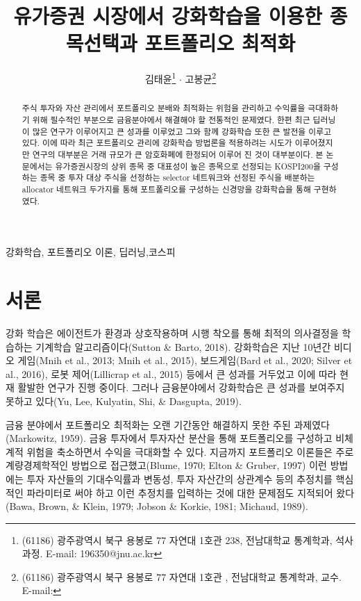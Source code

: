 \documentclass[a4paper]{article}
\begin{document}
\title{유가증권 시장에서 강화학습을 이용한 종목선택과 포트폴리오 최적화}%

\author{
김태윤\footnote{(61186) 광주광역시 북구 용봉로 77 자연대 1호관 238, 전남대학교 통계학과, 석사과정. E-mail: 196350@jnu.ac.kr} $\cdot$
고봉균\footnote{(61186) 광주광역시 북구 용봉로 77 자연대 1호관 , 전남대학교 통계학과, 교수. \\ E-mail: } 
}
\address{
${}^{1}${전남대학교 통계학과} $\cdot$ ${}^{2}${전남대학교 통계학과}
}

\accepted
\begin{abstract}
주식 투자와 자산 관리에서 포트폴리오 분배와 최적화는 위험을 관리하고 수익률을 극대화하기 위해 필수적인 부분으로 금융분야에서 해결해야 할 전통적인 문제였다. 한편 최근 딥러닝이 많은 연구가 이루어지고 큰 성과를 이루었고 그와 함께 강화학습 또한 큰 발전을 이루고 있다. 이에 따라 최근 포트폴리오 관리에 강화학습 방법론을 적용하려는 시도가 이루어졌지만 연구의 대부분은 거래 규모가 큰 암호화폐에 한정되어 이루어 진 것이 대부분이다. 본 논문에서는 유가증권시장의 상위 종목 중 대표성이 높은 종목으로 선정되는 KOSPI200을 구성하는 종목 중 투자 대상 주식을 선정하는 selector 네트워크와 선정된 주식을 배분하는 allocator 네트워크 두가지를 통해 포트폴리오를 구성하는 신경망을 강화학습을 통해 구현하였다.
\end{abstract}

\begin{keywords}{강화학습, 포트폴리오 이론, 딥러닝,코스피}
\end{keywords}

\section{서론}
강화 학습은 에이전트가 환경과 상호작용하며 시행 착오를 통해 최적의 의사결정을 학습하는 기계학습 알고리즘이다(Sutton \& Barto, 2018). 강화학습은 지난 10년간 비디오 게임(Mnih et al., 2013; Mnih et al., 2015), 보드게임(Bard et al., 2020; Silver et al., 2016), 로봇 제어(Lillicrap et al., 2015) 등에서 큰 성과를 거두었고 이에 따라 현재 활발한 연구가 진행 중이다. 그러나 금융분야에서 강화학습은 큰 성과를 보여주지 못하고 있다(Yu, Lee, Kulyatin, Shi, \& Dasgupta, 2019).
 
금융 분야에서 포트폴리오 최적화는 오랜 기간동안 해결하지 못한 주된 과제였다(Markowitz, 1959). 금융 투자에서 투자자산 분산을 통해 포트폴리오를 구성하고 비체계적 위험을 축소하면서 수익을 극대화할 수 있다. 지금까지 포트폴리오 이론들은 주로 계량경제학적인 방법으로 접근했고(Blume, 1970; Elton \& Gruber, 1997) 이런 방법에는 투자 자산들의 기대수익률과 변동성, 투자 자산간의 상관계수 등의 추정치를 핵심적인 파라미터로 써야 하고 이런 추정치를 입력하는 것에 대한 문제점도 지적되어 왔다(Bawa, Brown, \& Klein, 1979; Jobson \& Korkie, 1981; Michaud, 1989).
\end{document}
